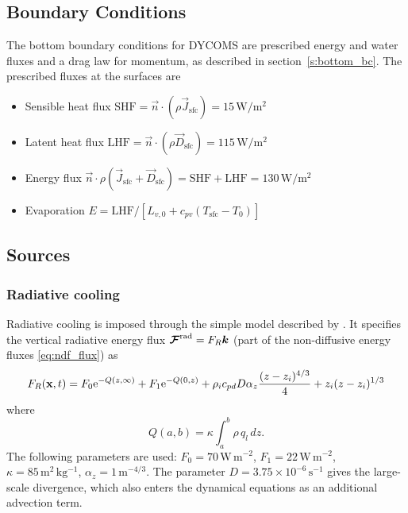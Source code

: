 \documentclass{report}
\begin{document}
\subsection{Boundary Conditions}

The bottom boundary conditions for DYCOMS are prescribed energy and water fluxes and a drag law for momentum, as described in section~\ref{s:bottom_bc}. The prescribed fluxes at the surfaces are
\begin{itemize} 
\item Sensible heat flux $\mathrm{SHF} = \vec{n} \cdot (\rho \vec{J}_{\mathrm{sfc}}) = 15\,\mathrm{W/m^2}$
\item Latent heat flux $\mathrm{LHF} = \vec{n} \cdot (\rho \vec{D}_{\mathrm{sfc}}) = 115\,\mathrm{W/m^2}$
\item Energy flux $\vec{n} \cdot \rho (\vec{J}_{\mathrm{sfc}} + \vec{D}_{\mathrm{sfc}}) = \mathrm{SHF + LHF} = 130\,\mathrm{W/m^2}$
\item Evaporation $E = \mathrm{LHF}/[L_{v,0} + c_{pv}(T_\mathrm{sfc} - T_0)]$
\end{itemize}

\subsection{Sources}

\subsubsection{Radiative cooling}
Radiative cooling is imposed through the simple model described by \cite{Stevens05a}. It specifies the vertical radiative energy flux $\boldsymbol{{\mathcal{F}}}^{\mathrm{rad}} = F_R \boldsymbol{{k}}$ (part of the non-diffusive energy fluxes \eqref{eq:ndf_flux}) as
\begin{equation}
    \label{e:radiativeStevens05}
    F_{R}({\bf x}, t) = F_0{\rm e}^{-Q(z,\infty)} +
    F_1{\rm e}^{-Q(0, z)} +
    \rho_i c_{pd} D \alpha_z\frac{(z-z_i)^{4/3}}{4} + z_i(z - z_i)^{1/3}
\end{equation}
where 
\begin{equation}
    Q(a,b) = \kappa\int_{a}^{b}\rho\,q_l\,dz.
\end{equation}
The following parameters are used:
$F_0=70\,\mathrm{W\,m^{-2}}$, $F_1=22\,\mathrm{W\,m^{-2}}$, $\kappa=85\,\mathrm{m^2\,kg^{-1}}$, $\alpha_z=1\,\mathrm{m^{-4/3}}$. The parameter $D=3.75\times 10^{-6}\,\mathrm{s^{-1}}$ gives the large-scale divergence, which also enters the dynamical equations as an additional advection term.  
\end{document}
